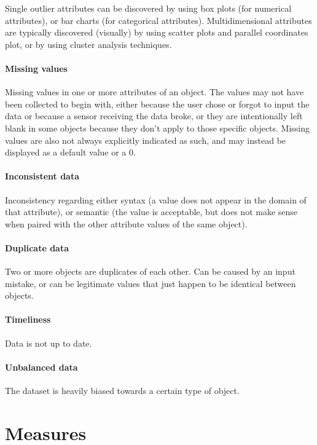 Single outlier attributes can be discovered by using box plots (for numerical attributes), or bar charts (for categorical attributes). Multidimensional attributes are typically discovered (visually) by using scatter plots and parallel coordinates plot, or by using cluster analysis techniques.

\paragraph{Missing values}
Missing values in one or more attributes of an object. The values may not have been collected to begin with, either because the user chose or forgot to input the data or because a sensor receiving the data broke, or they are intentionally left blank in some objects because they don't apply to those specific objects. Missing values are also not always explicitly indicated as such, and may instead be displayed as a default value or a 0.

\paragraph{Inconsistent data}
Inconsistency regarding either syntax (a value does not appear in the domain of that attribute), or semantic (the value is acceptable, but does not make sense when paired with the other attribute values of the same object).

\paragraph{Duplicate data}
Two or more objects are duplicates of each other. Can be caused by an input mistake, or can be legitimate values that just happen to be identical between objects.

\paragraph{Timeliness}
Data is not up to date.

\paragraph{Unbalanced data}
The dataset is heavily biased towards a certain type of object.

\section{Measures}

